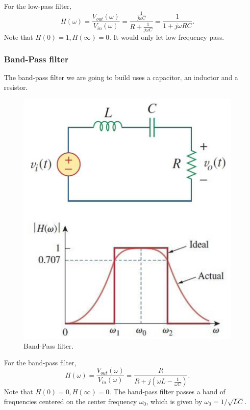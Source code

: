 \documentclass{article}
\begin{document}
For the low-pass filter,
$$H(\omega) = \frac{V_{out}(\omega)}{V_{in}(\omega)} = \frac{\frac{1}{j\omega C}}{R+\frac{1}{j\omega C}} = \frac{1}{1+j\omega RC}.$$
Note that $H(0) = 1, H(\infty) = 0$. It would only let low frequency pass.

\subsubsection{Band-Pass filter}
The band-pass filter we are going to build uses a capacitor, an inductor and a resistor.
\begin{figure}[H]\centering
    \includegraphics[scale=0.5]{bandpass.png}
    \caption{Band-Pass filter.}
\end{figure}

For the band-pass filter,
$$H(\omega) = \frac{V_{out}(\omega)}{V_{in}(\omega)} = \frac{R}{R+j(\omega L-\frac{1}{\omega C})}.$$
Note that $H(0) = 0, H(\infty) = 0.$ The band-pass filter passes a band of frequencies centered on the center frequency $\omega_0$, which is given by $\omega_0 = 1/\sqrt{LC}$.
\end{document}
